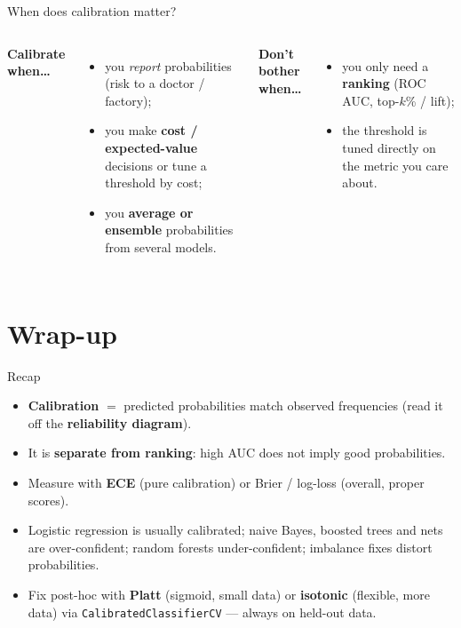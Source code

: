 \documentclass[aspectratio=169]{beamer}
\begin{document}
\begin{frame}{When does calibration matter?}
  \begin{columns}[T]
    \textbf{Calibrate when\dots}
    \begin{itemize}\small
      \item you \emph{report} probabilities (risk to a doctor / factory);
      \item you make \textbf{cost / expected-value} decisions or tune a threshold by cost;
      \item you \textbf{average or ensemble} probabilities from several models.
    \end{itemize}
    \textbf{Don't bother when\dots}
    \begin{itemize}\small
      \item you only need a \textbf{ranking} (ROC AUC, top-$k$\% / lift);
      \item the threshold is tuned directly on the metric you care about.
    \end{itemize}
  \end{columns}
  \vfill
\end{frame}

\section*{Wrap-up}

\begin{frame}{Recap}
  \begin{itemize}\small
    \item \textbf{Calibration} $=$ predicted probabilities match observed frequencies (read it
      off the \textbf{reliability diagram}).
    \item It is \textbf{separate from ranking}: high AUC does not imply good probabilities.
    \item Measure with \textbf{ECE} (pure calibration) or Brier / log-loss (overall, proper scores).
    \item Logistic regression is usually calibrated; naive Bayes, boosted trees and nets are
      over-confident; random forests under-confident; imbalance fixes distort probabilities.
    \item Fix post-hoc with \textbf{Platt} (sigmoid, small data) or \textbf{isotonic} (flexible,
      more data) via \texttt{CalibratedClassifierCV} --- always on held-out data.
  \end{itemize}
  \vfill
\end{frame}
\end{document}
